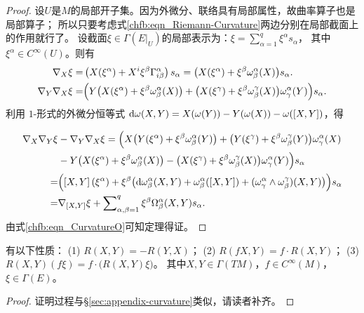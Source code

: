 \begin{proof}
设$U$是$M$的局部开子集。因为外微分、联络具有局部属性，故曲率算子也是局部算子；
所以只要考虑式\eqref{chfb:eqn_Riemann-Curvature}两边分别在局部截面上的作用就行了。
设截面$\xi \in \Gamma(E|_U)$的局部表示为：$\xi =\sum_{\alpha=1}^q \xi^\alpha s_\alpha$，
其中$\xi^\alpha \in C^\infty(U)$。则有
\begin{align*}
    \nabla_X \xi= & \left(X (\xi^\alpha )+ X^i \xi^\beta \Gamma^\alpha_{i \beta} \right) s_\alpha
    = \bigl(X (\xi^\alpha )+ \xi^\beta \omega_{\beta}^\alpha(X) \bigr) s_\alpha . \\
    \nabla_Y \nabla_X \xi= & \Bigl(
    Y \bigl(X (\xi^\alpha )+ \xi^\beta \omega_{\beta}^\alpha(X) \bigr)+
    \bigl(X (\xi^\gamma )+ \xi^\beta \omega_{\beta}^\gamma(X) \bigr)
    \omega_{\gamma}^\alpha(Y)
    \Bigr) s_\alpha .
\end{align*}
利用 $1$-形式的外微分恒等式 $\dd\omega(X,Y)=X(\omega(Y))-Y(\omega(X))-\omega([X,Y])$，得

\begin{align*}
    \nabla_X \nabla_Y \xi & -\nabla_Y \nabla_X \xi =
    \Bigl(
     X \bigl(Y (\xi^\alpha )+ \xi^\beta \omega_{\beta}^\alpha(Y) \bigr)+
     \bigl(Y (\xi^\gamma )+ \xi^\beta \omega_{\beta}^\gamma(Y) \bigr)
     \omega_{\gamma}^\alpha(X) \\
    &-Y \bigl(X (\xi^\alpha )+ \xi^\beta \omega_{\beta}^\alpha(X) \bigr)-
    \bigl(X (\xi^\gamma )+ \xi^\beta \omega_{\beta}^\gamma(X) \bigr)
    \omega_{\gamma}^\alpha(Y)     \Bigr)s_\alpha \\
   =&\Bigl( \left[X,Y\right](\xi^\alpha)
   +\xi^\beta \bigl( \dd \omega_{\beta}^\alpha (X,Y)
   +\omega_{\beta}^\alpha([X,Y])
   + (\omega_{\gamma}^\alpha \wedge \omega_{\beta}^\gamma)(X,Y)
    \bigr)  \Bigr)s_\alpha  \\
   =&\nabla_{[X,Y]} \xi + \sum\nolimits_{\alpha,\beta=1}^{q}
   \xi^\beta \Omega_{\beta}^\alpha (X,Y) s_\alpha .
\end{align*}
由式\eqref{chfb:eqn_CurvatureO}可知定理得证。
\end{proof}

\begin{theorem}\label{chfb:thm_RP}
    有以下性质：
    (1) $R(X, Y)=-R(Y, X)$；
    (2) $R(f X, Y)=f \cdot R(X, Y)$；
    (3) $R(X, Y)(f \xi)=f \cdot\bigl(R(X, Y) \xi\bigr)$。
    其中$X, Y \in \Gamma(TM)$，$ f \in C^{\infty}(M)$，$ \xi \in \Gamma(E)$。
\end{theorem}
\begin{proof}
    证明过程与\S\ref{sec:appendix-curvature}类似，请读者补齐。
\end{proof}


